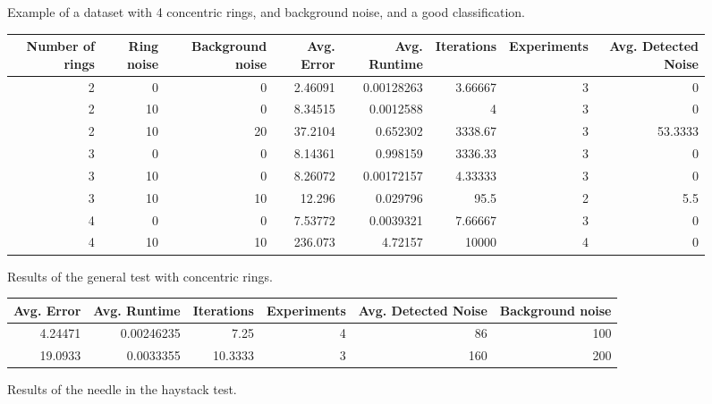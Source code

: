 \documentclass[conference]{IEEEtran}
\begin{document}
\begin{figure}[H]
    \centering
    \resizebox{0.9\linewidth}{!}{}
    \label{fig:concentric_rings}
    \caption{Example of a dataset with 4 concentric rings, and background noise, and a good classification.}
\end{figure}

\begin{figure*}[!ht]
\centering
\begin{tabular}{rrrrrrrr}
    \hline
       Number of rings &   Ring noise &   Background noise &   Avg. Error &   Avg. Runtime &   Iterations &   Experiments &   Avg. Detected Noise \\
    \hline
                     2 &            0 &                  0 &      2.46091 &     0.00128263 &      3.66667 &             3 &                0      \\
                     2 &           10 &                  0 &      8.34515 &     0.0012588  &      4       &             3 &                0      \\
                     2 &           10 &                 20 &     37.2104  &     0.652302   &   3338.67    &             3 &               53.3333 \\
                     3 &            0 &                  0 &      8.14361 &     0.998159   &   3336.33    &             3 &                0      \\
                     3 &           10 &                  0 &      8.26072 &     0.00172157 &      4.33333 &             3 &                0      \\
                     3 &           10 &                 10 &     12.296   &     0.029796   &     95.5     &             2 &                5.5    \\
                     4 &            0 &                  0 &      7.53772 &     0.0039321  &      7.66667 &             3 &                0      \\
                     4 &           10 &                 10 &    236.073   &     4.72157    &  10000       &             4 &                0      \\
    \hline
    \end{tabular}
\caption{Results of the general test with concentric rings.}
\end{figure*}
\begin{figure*}[!ht]
    \centering
    \begin{tabular}{rrrrrr}
        \hline
           Avg. Error &   Avg. Runtime &   Iterations &   Experiments &   Avg. Detected Noise &   Background noise \\
        \hline
              4.24471 &     0.00246235 &       7.25   &             4 &                    86 &                100 \\
             19.0933  &     0.0033355  &      10.3333 &             3 &                   160 &                200 \\
        \hline
    \end{tabular}
    \caption{Results of the needle in the haystack test.}
\end{figure*}
\end{document}
